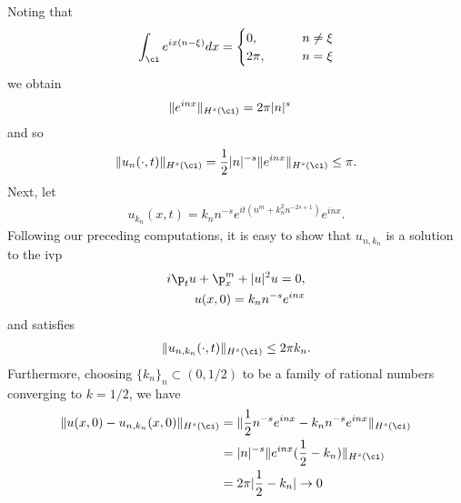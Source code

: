 %
%
Noting that
%
\begin{equation*}
	\begin{split}
		\int_{\ci}e^{ix(n - \xi)}dx =
		\begin{cases}0, \qquad & n \neq \xi
			\\
			2 \pi, \qquad & n = \xi
		\end{cases}
	\end{split}
\end{equation*}
%
%
we obtain
%
%
\begin{equation}
	\label{1oscill-bound}
	\begin{split}
		\|e^{inx}\|_{H^{s}(\ci)} & = 2 \pi| n |^{s}
	\end{split}
\end{equation}
%
%
and so
%
%
\begin{equation*}
	\begin{split}
		\|u_{n}(\cdot, t)\|_{H^s{(\ci)}} = \frac{1}{2}|n|^{-s}
		\|e^{inx}\|_{H^{s}(\ci)} \le \pi.
	\end{split}
\end{equation*}
%
%
Next, let
%
%
\begin{equation*}
	\begin{split}
		u_{k_{n}}(x,t) = k_{n}n^{-s}e^{it\left( n^{m} + k_{n}^2 n^{-2s+1}
		\right)}e^{inx}.
	\end{split}
\end{equation*}
%
%
Following our preceding computations, it is easy to show that $u_{n, k_{n}}$ is a solution to the ivp
%
%
\begin{equation}
	\label{1family-ivp}
	\begin{split}
		i\p_t u + \p_x^{m} + | u |^{2}u = 0,
		\\
		u(x,0) = k_{n}n^{-s}e^{inx}
	\end{split}
\end{equation}
%
%
and satisfies 
%
%
\begin{equation*}
	\begin{split}
		\|u_{n, k_{n}}(\cdot, t)\|_{H^{s}(\ci)} \le 2 \pi k_{n}.
	\end{split}
\end{equation*}
%
%
Furthermore, choosing $\{k_{n}\}_{n} \subset (0, 1/2)$ to be a family of
rational numbers converging to $k =1/2$, we have
%
%
\begin{equation*}
	\begin{split}
		\|u(x,0) - u_{n, k_{n}}(x, 0) \|_{H^s(\ci)} 
		& =
		\|\frac{1}{2}n^{-s}e^{inx} - k_{n}n^{-s}e^{inx} \|_{H^s(\ci)}
		\\
		& = | n |^{-s} \|e^{inx}(\frac{1}{2} - k_{n})\|_{H^s(\ci)}
		\\
		& = 2 \pi |\frac{1}{2} - k_{n}| \to 0
	\end{split}
\end{equation*}
